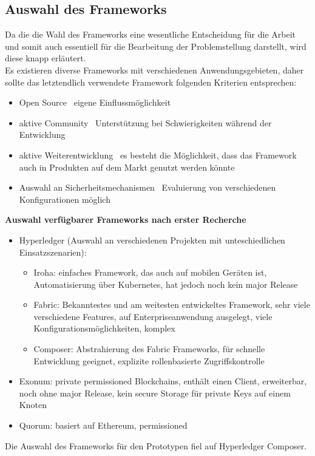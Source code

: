 \subsection{Auswahl des Frameworks}
\label{sec:prototype_framework}
    Da die die Wahl des Frameworks eine wesentliche Entscheidung für die Arbeit und somit auch essentiell für die Bearbeitung der Problemstellung darstellt, wird diese knapp erläutert.
    \medskip\\
    Es existieren diverse Frameworks mit verschiedenen Anwendungsgebieten, daher sollte das letztendlich verwendete Framework folgenden Kriterien entsprechen:
    \begin{itemize}[noitemsep]
        \item Open Source \textrightarrow\ eigene Einflussmöglichkeit
        \item aktive Community \textrightarrow\ Unterstützung bei Schwierigkeiten während der Entwicklung
        \item aktive Weiterentwicklung \textrightarrow\ es besteht die Möglichkeit, dass das Framework auch in Produkten auf dem Markt genutzt werden könnte
        \item Auswahl an Sicherheitsmechanismen \textrightarrow\ Evaluierung von verschiedenen Konfigurationen möglich
    \end{itemize}
    \medskip
    \textbf{Auswahl verfügbarer Frameworks nach erster Recherche}
    \begin{itemize}[noitemsep]
        \item Hyperledger (Auswahl an verschiedenen Projekten mit unteschiedlichen Einsatzszenarien):
            \begin{itemize}[noitemsep]
                \item Iroha: einfaches Framework, das auch auf mobilen Geräten ist, Automatisierung über Kubernetes, hat jedoch noch kein major Release
                \item Fabric: Bekanntestes und am weitesten entwickeltes Framework, sehr viele verschiedene Features, auf Enterpriseanwendung ausgelegt, viele Konfigurationsmöglichkeiten, komplex
                \item Composer: Abstrahierung des Fabric Frameworks, für schnelle Entwicklung geeignet, explizite rollenbasierte Zugriffskontrolle
            \end{itemize}
        \item Exonum: private permissioned Blockchains, enthält einen Client, erweiterbar, noch ohne major Release, kein secure Storage für private Keys auf einem Knoten
        \item Quorum: basiert auf Ethereum, permissioned
    \end{itemize}
    Die Auswahl des Frameworks für den Prototypen fiel auf Hyperledger Composer.
